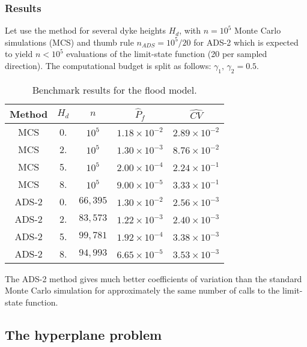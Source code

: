 \newpage

\subsubsection{Results}

Let use the method for several dyke heights $H_d$, with $n=10^5$ Monte Carlo simulations (MCS) and thumb rule $n_{ADS}=10^5/20$ for ADS-2 which is expected to yield $n < 10^5$ evaluations of the limit-state function (20 per sampled direction). The computational budget is split as follows: $\gamma_1,\,\gamma_2 = 0.5$.\par

\begin{table}
    \centering
    \begin{tabular}{ccccc}
        \hline
        Method & $H_d$ & $n$ & $\hat P_f$ & $\hat {CV}$ \\
        \hline
        MCS & 0. & $10^5$ & $1.18 \times 10^{-2}$ & $2.89 \times 10^{-2}$\\
        MCS & 2. & $10^5$ & $1.30 \times 10^{-3}$ & $8.76 \times 10^{-2}$\\
        MCS & 5. & $10^5$ & $2.00 \times 10^{-4}$ & $2.24 \times 10^{-1}$\\
        MCS & 8. & $10^5$ & $9.00 \times 10^{-5}$ & $3.33 \times 10^{-1}$\\
        ADS-2 & 0.& $66,395$ & $1.30 \times 10^{-2}$ & $2.56 \times 10^{-3}$\\
        ADS-2 & 2.& $83,573$ & $1.22 \times 10^{-3}$ & $2.40 \times 10^{-3}$\\
        ADS-2 & 5.& $99,781$ & $1.92 \times 10^{-4}$ & $3.38 \times 10^{-3}$\\
        ADS-2 & 8.& $94,993$ & $6.65 \times 10^{-5}$ & $3.53 \times 10^{-3}$\\
        \hline
    \end{tabular}
    \caption{Benchmark results for the flood model.}
\end{table}

The ADS-2 method gives much better coefficients of variation than the standard Monte Carlo simulation for approximately the same number of calls to the limit-state function.\par

\newpage

\subsection{The hyperplane problem}

